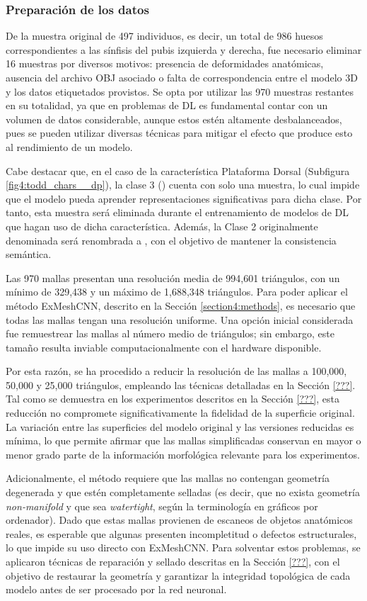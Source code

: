 \subsubsection{Preparación de los datos}
De la muestra original de 497 individuos, es decir, un total de 986 huesos correspondientes a las sínfisis del pubis izquierda y derecha, fue necesario eliminar 16 muestras por diversos motivos: presencia de deformidades anatómicas, ausencia del archivo OBJ asociado o falta de correspondencia entre el modelo 3D y los datos etiquetados provistos. Se opta por utilizar las 970 muestras restantes en su totalidad, ya que en problemas de DL es fundamental contar con un volumen de datos considerable, aunque estos estén altamente desbalanceados, pues se pueden utilizar diversas técnicas para mitigar el efecto que produce esto al rendimiento de un modelo. 

Cabe destacar que, en el caso de la característica Plataforma Dorsal (Subfigura \ref{fig4:todd_chars__dp}), la clase 3 () cuenta con solo una muestra, lo cual impide que el modelo pueda aprender representaciones significativas para dicha clase. Por tanto, esta muestra será eliminada durante el entrenamiento de modelos de DL que hagan uso de dicha característica. Además, la Clase 2 originalmente denominada  será renombrada a , con el objetivo de mantener la consistencia semántica.

Las 970 mallas presentan una resolución media de 994,601 triángulos, con un mínimo de 329,438 y un máximo de 1,688,348 triángulos. Para poder aplicar el método ExMeshCNN, descrito en la Sección \ref{section4:methods}, es necesario que todas las mallas tengan una resolución uniforme. Una opción inicial considerada fue remuestrear las mallas al número medio de triángulos; sin embargo, este tamaño resulta inviable computacionalmente con el hardware disponible.

Por esta razón, se ha procedido a reducir la resolución de las mallas a 100,000, 50,000 y 25,000 triángulos, empleando las técnicas detalladas en la Sección \ref{???}. Tal como se demuestra en los experimentos descritos en la Sección \ref{???}, esta reducción no compromete significativamente la fidelidad de la superficie original. La variación entre las superficies del modelo original y las versiones reducidas es mínima, lo que permite afirmar que las mallas simplificadas conservan en mayor o menor grado parte de la información morfológica relevante para los experimentos.

Adicionalmente, el método requiere que las mallas no contengan geometría degenerada y que estén completamente selladas (es decir, que no exista geometría \textit{non-manifold} y que sea \textit{watertight}, según la terminología en gráficos por ordenador). Dado que estas mallas provienen de escaneos de objetos anatómicos reales, es esperable que algunas presenten incompletitud o defectos estructurales, lo que impide su uso directo con ExMeshCNN. Para solventar estos problemas, se aplicaron técnicas de reparación y sellado descritas en la Sección \ref{???}, con el objetivo de restaurar la geometría y garantizar la integridad topológica de cada modelo antes de ser procesado por la red neuronal.


